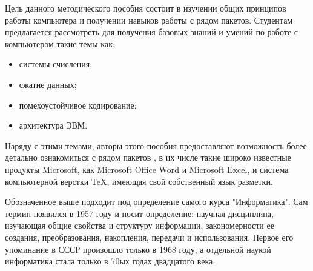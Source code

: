 Цель данного методического пособия состоит в изучении общих принципов работы компьютера и получении навыков работы с рядом пакетов. Студентам предлагается рассмотреть для получения базовых знаний и умений по работе с компьютером такие темы как: 
\begin{itemize}
\item системы счисления;
\item сжатие данных;
\item помехоустойчивое кодирование;
\item архитектура ЭВМ.
\end{itemize}

Наряду с этими темами, авторы этого пособия предоставляют возможность более детально ознакомиться с рядом пакетов
, в их числе такие широко известные продукты Microsoft, как Microsoft Office Word и Microsoft Excel, и система компьютерной верстки TeX, имеющая свой собственный язык разметки.

Обозначенное выше подходит под определение самого курса "Информатика". Сам термин появился в 1957 году и носит определение: научная дисциплина, изучающая общие свойства и структуру информации, закономерности ее создания, преобразования, накопления, передачи и использования. Первое его упоминание в СССР произошло только в 1968 году, а отдельной наукой информатика стала только в 70ых годах двадцатого века. 
